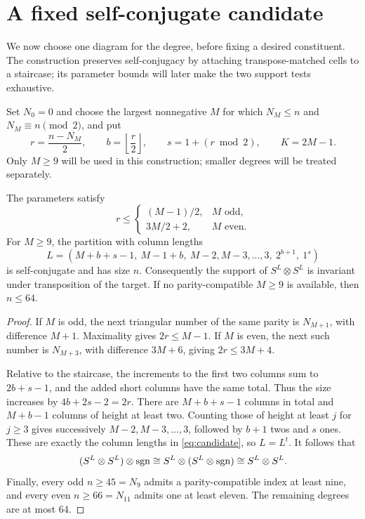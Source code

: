 \section{A fixed self-conjugate candidate}
\label{sec:candidate}

We now choose one diagram for the degree, before fixing a desired
constituent. The construction preserves self-conjugacy by attaching
transpose-matched cells to a staircase; its parameter bounds will
later make the two support tests exhaustive.

Set $N_0=0$ and choose the largest nonnegative $M$ for which
$N_M\le n$ and $N_M\equiv n\pmod2$,
and put
\begin{equation}\label{eq:parameters}
 r=\frac{n-N_M}{2},\qquad b=\left\lfloor\frac r2\right\rfloor,
 \qquad s=1+(r\bmod2),\qquad K=2M-1.
\end{equation}
Only $M\ge9$ will be used in this construction; smaller degrees will
be treated separately.

\begin{lemma}\label{lem:candidate}
The parameters satisfy
\begin{equation}\label{eq:r-bounds}
 r\le\begin{cases}(M-1)/2,&M\text{ odd},\\3M/2+2,&M\text{ even}.
 \end{cases}
\end{equation}
For $M\ge9$, the partition with column lengths
\begin{equation}\label{eq:candidate}
 L=(M+b+s-1,\ M-1+b,\ M-2,M-3,\ldots,3,\ 2^{b+1},\ 1^s)
\end{equation}
is self-conjugate and has size $n$. Consequently the support of
$S^L\otimes S^L$ is invariant under transposition of the target.
If no parity-compatible $M\ge9$ is available, then $n\le64$.
\end{lemma}

\begin{proof}
If $M$ is odd, the next triangular number of the same parity is
$N_{M+1}$, with difference $M+1$. Maximality gives
$2r\le M-1$. If $M$ is even, the next such number is $N_{M+3}$,
with difference $3M+6$, giving $2r\le3M+4$.

Relative to the staircase, the increments to the first two columns
sum to $2b+s-1$, and the added short columns have the same total.
Thus the size increases by $4b+2s-2=2r$. There are $M+b+s-1$
columns in total and $M+b-1$ columns of height at least two.
Counting those of height at least $j$ for $j\ge3$ gives successively
$M-2,M-3,\ldots,3$, followed by $b+1$ twos and $s$ ones.
These are exactly the column lengths in \eqref{eq:candidate}, so
$L=L^t$. It follows that
\[
 (S^L\otimes S^L)\otimes\operatorname{sgn}
 \cong S^L\otimes(S^L\otimes\operatorname{sgn})
 \cong S^L\otimes S^L.
\]
Finally, every odd $n\ge45=N_9$ admits a parity-compatible index
at least nine, and every even $n\ge66=N_{11}$ admits one at least
eleven. The remaining degrees are at most $64$.
\end{proof}

